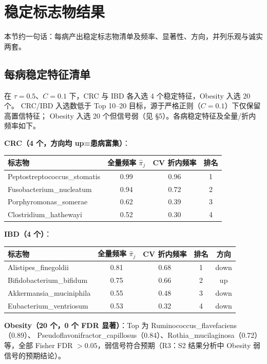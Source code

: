 \documentclass{internal-report}
\begin{document}
\section{稳定标志物结果}
本节约一句话：每病产出稳定标志物清单及频率、显著性、方向，并列乐观与诚实两套。

\subsection{每病稳定特征清单}
在 $\tau=0.5$、$C=0.1$ 下，CRC 与 IBD 各入选 4 个稳定特征，Obesity 入选 20 个。
CRC/IBD 入选数低于 Top 10--20 目标，源于严格正则（$C=0.1$）下仅保留高置信特征；
Obesity 入选 20 个但信号弱（见 §5）。各病稳定特征及全量/折内频率如下。

\textbf{CRC（4 个，方向均 up=患病富集）}：
\begin{center}
\footnotesize
\begin{tabular}{l c c c}
\toprule
标志物 & 全量频率 $\hat{\pi}_j$ & CV 折内频率 & 排名 \\
\midrule
Peptostreptococcus\_stomatis & 0.99 & 0.96 & 1 \\
Fusobacterium\_nucleatum & 0.94 & 0.72 & 2 \\
Porphyromonas\_somerae & 0.62 & 0.39 & 3 \\
Clostridium\_hathewayi & 0.52 & 0.30 & 4 \\
\bottomrule
\end{tabular}
\end{center}

\textbf{IBD（4 个）}：
\begin{center}
\footnotesize
\begin{tabular}{l c c c c}
\toprule
标志物 & 全量频率 $\hat{\pi}_j$ & CV 折内频率 & 排名 & 方向 \\
\midrule
Alistipes\_finegoldii & 0.81 & 0.68 & 1 & down \\
Bifidobacterium\_bifidum & 0.75 & 0.66 & 2 & up \\
Akkermansia\_muciniphila & 0.55 & 0.48 & 3 & down \\
Eubacterium\_ventriosum & 0.53 & 0.32 & 4 & down \\
\bottomrule
\end{tabular}
\end{center}

\textbf{Obesity（20 个，0 个 FDR 显著）}：Top 为 Ruminococcus\_flavefaciens（0.89）、
Pseudoflavonifractor\_capillosus（0.84）、Rothia\_mucilaginosa（0.72）等，全部
Fisher FDR $>0.05$，弱信号符合预期（R3：S2 结果分析中 Obesity 弱信号的预期结论）。
\end{document}
